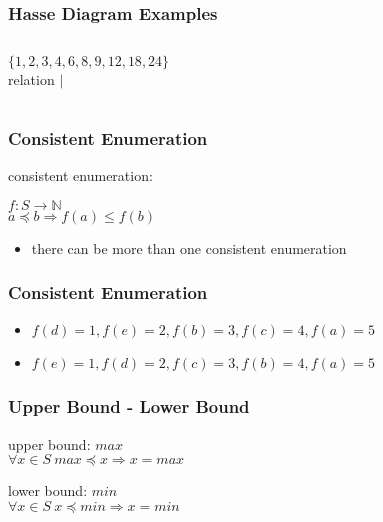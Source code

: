 \documentclass[dvipsnames]{beamer}
\begin{document}
\begin{frame}
  \frametitle{Hasse Diagram Examples}

  \begin{example}
    \begin{columns}
      $\{1,2,3,4,6,8,9,12,18,24\}$\\
      relation $|$

      \begin{center}
      \end{center}
    \end{columns}
  \end{example}
\end{frame}

\begin{frame}
  \frametitle{Consistent Enumeration}

  \begin{definition}
    \alert{consistent enumeration}:

    $f: S \rightarrow \mathbb{N}$\\
    $a \preceq b \Rightarrow f(a) \leq f(b)$
  \end{definition}

  \begin{itemize}
    \item there can be more than one consistent enumeration
  \end{itemize}
\end{frame}

\begin{frame}
  \frametitle{Consistent Enumeration}

  \begin{example}
    \begin{center}
    \end{center}

    \begin{itemize}
     \item $f(d)=1, f(e)=2, f(b)=3, f(c)=4, f(a)=5$

     \pause
     \item $f(e)=1, f(d)=2, f(c)=3, f(b)=4, f(a)=5$
    \end{itemize}
  \end{example}
\end{frame}

\begin{frame}
  \frametitle{Upper Bound - Lower Bound}

  \begin{definition}
    \alert{upper bound}: $max$\\
    $\forall x \in S~max \preceq x \Rightarrow x = max$
  \end{definition}

  \pause
  \begin{definition}
    \alert{lower bound}: $min$\\
    $\forall x \in S~x \preceq min \Rightarrow x = min$
  \end{definition}
\end{frame}
\end{document}
